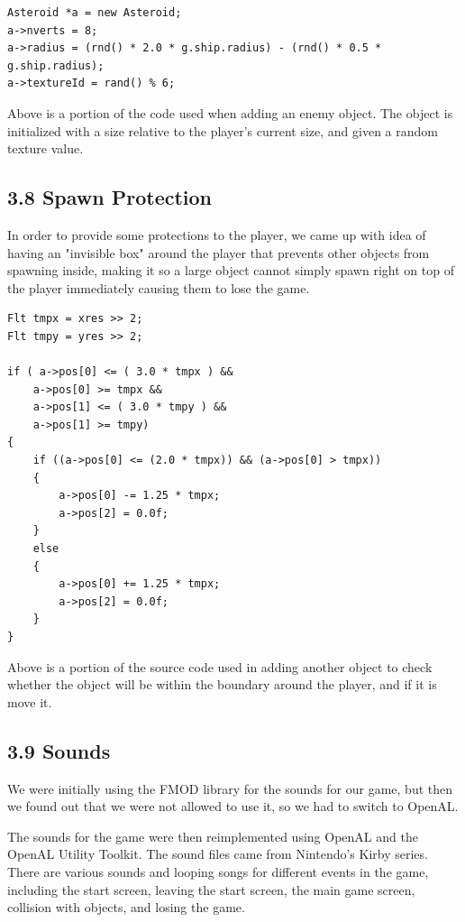\documentclass[12pt]{report}
\begin{document}
\begin{lstlisting}
Asteroid *a = new Asteroid;
a->nverts = 8;
a->radius = (rnd() * 2.0 * g.ship.radius) - (rnd() * 0.5 * g.ship.radius);
a->textureId = rand() % 6;
\end{lstlisting}

\noindent Above is a portion of the code used when adding an enemy object. The object is initialized with a size relative to the player's current size, and given a random texture value.

\newpage
\subsection*{3.8 Spawn Protection}
In order to provide some protections to the player, we came up with idea of having an "invisible box" around the player that prevents other objects from spawning inside, making it so a large object cannot simply spawn right on top of the player immediately causing them to lose the game. \bigskip

\begin{lstlisting}
Flt tmpx = xres >> 2;
Flt tmpy = yres >> 2;

if ( a->pos[0] <= ( 3.0 * tmpx ) &&
	a->pos[0] >= tmpx &&
	a->pos[1] <= ( 3.0 * tmpy ) &&
	a->pos[1] >= tmpy)
{
	if ((a->pos[0] <= (2.0 * tmpx)) && (a->pos[0] > tmpx))
	{
		a->pos[0] -= 1.25 * tmpx;
		a->pos[2] = 0.0f;
	}
	else
	{
		a->pos[0] += 1.25 * tmpx;
		a->pos[2] = 0.0f;
	}
}
\end{lstlisting}
\noindent Above is a portion of the source code used in adding another object to check whether the object will be within the boundary around the player, and if it is move it.

\newpage
\subsection*{3.9 Sounds}
We were initially using the FMOD library for the sounds for our game, but then we found out that we were not allowed to use it, so we had to switch to OpenAL. \bigskip

The sounds for the game were then reimplemented using OpenAL and the OpenAL Utility Toolkit. The sound files came from Nintendo's Kirby series. There are various sounds and looping songs for different events in the game, including the start screen, leaving the start screen, the main game screen, collision with objects, and losing the game.
\end{document}
